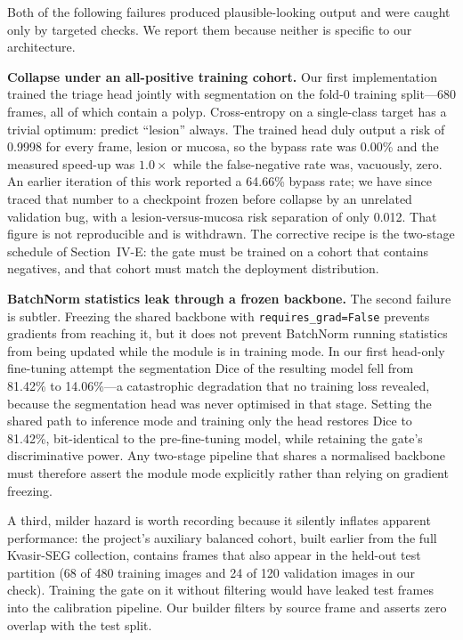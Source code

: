 \documentclass[journal]{IEEEtran}
\begin{document}
Both of the following failures produced plausible-looking output and were caught only by targeted checks. We report them because neither is specific to our architecture.

\textbf{Collapse under an all-positive training cohort.} Our first implementation trained the triage head jointly with segmentation on the fold-0 training split---680 frames, all of which contain a polyp. Cross-entropy on a single-class target has a trivial optimum: predict ``lesion'' always. The trained head duly output a risk of 0.9998 for every frame, lesion or mucosa, so the bypass rate was 0.00\% and the measured speed-up was $1.0\times$ while the false-negative rate was, vacuously, zero. An earlier iteration of this work reported a 64.66\% bypass rate; we have since traced that number to a checkpoint frozen before collapse by an unrelated validation bug, with a lesion-versus-mucosa risk separation of only 0.012. That figure is not reproducible and is withdrawn. The corrective recipe is the two-stage schedule of Section~IV-E: the gate must be trained on a cohort that contains negatives, and that cohort must match the deployment distribution.

\textbf{BatchNorm statistics leak through a frozen backbone.} The second failure is subtler. Freezing the shared backbone with \texttt{requires\_grad=False} prevents gradients from reaching it, but it does not prevent BatchNorm running statistics from being updated while the module is in training mode. In our first head-only fine-tuning attempt the segmentation Dice of the resulting model fell from 81.42\% to 14.06\%---a catastrophic degradation that no training loss revealed, because the segmentation head was never optimised in that stage. Setting the shared path to inference mode and training only the head restores Dice to 81.42\%, bit-identical to the pre-fine-tuning model, while retaining the gate's discriminative power. Any two-stage pipeline that shares a normalised backbone must therefore assert the module mode explicitly rather than relying on gradient freezing.

A third, milder hazard is worth recording because it silently inflates apparent performance: the project's auxiliary balanced cohort, built earlier from the full Kvasir-SEG collection, contains frames that also appear in the held-out test partition (68 of 480 training images and 24 of 120 validation images in our check). Training the gate on it without filtering would have leaked test frames into the calibration pipeline. Our builder filters by source frame and asserts zero overlap with the test split.
\end{document}
